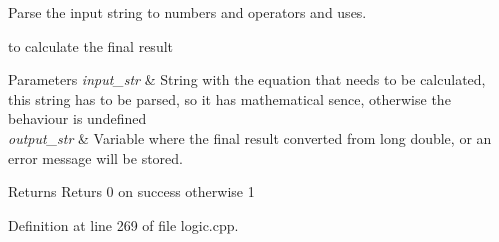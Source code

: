 Parse the input string to numbers and operators and uses. 

to calculate the final result 
\begin{DoxyParams}{Parameters}
{\em input\+\_\+str} & String with the equation that needs to be calculated, this string has to be parsed, so it has mathematical sence, otherwise the behaviour is undefined \\
\hline
{\em output\+\_\+str} & Variable where the final result converted from long double, or an error message will be stored. \\
\hline
\end{DoxyParams}
\begin{DoxyReturn}{Returns}
Returs 0 on success otherwise 1 
\end{DoxyReturn}


Definition at line 269 of file logic.\+cpp.


